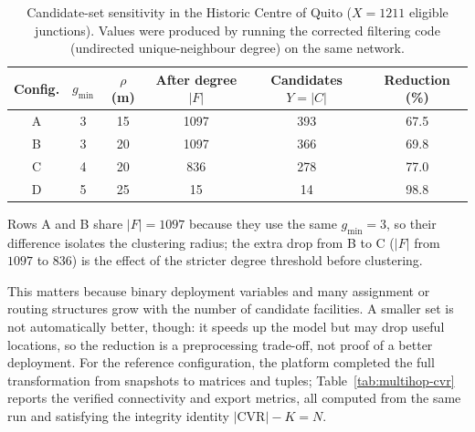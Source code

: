 \documentclass[engproc,proceedingpaper,submit,oneauthor]{Definitions/mdpi}
\newcommand{\CVR}{\mathrm{CVR}}
\begin{document}
\begin{table}[H]
\centering
\caption{Candidate-set sensitivity in the Historic Centre of Quito
($X=1211$ eligible junctions). Values were produced by running the corrected filtering
code (undirected unique-neighbour degree) on the same network.}\label{tab:sensitivity}
\small
\begin{tabular}{cccccc}
\toprule
Config. & $g_{\min}$ & $\rho$ (m) & After degree $|F|$ &
Candidates $Y=|C|$ & Reduction (\%)\\
\midrule
A & 3 & 15 & 1097 & 393 & 67.5\\
B & 3 & 20 & 1097 & 366 & 69.8\\
C & 4 & 20 & \phantom{0}836 & 278 & 77.0\\
D & 5 & 25 & \phantom{00}15 & \phantom{0}14 & 98.8\\
\bottomrule
\end{tabular}
\end{table}

Rows A and B share $|F|=1097$ because they use the same $g_{\min}=3$, so their
difference isolates the clustering radius; the extra drop from B to C ($|F|$ from
$1097$ to $836$) is the effect of the stricter degree threshold before clustering.

This matters because binary deployment variables and many assignment or routing
structures grow with the number of candidate facilities. A smaller set is not
automatically better, though: it speeds up the model but may drop useful locations, so
the reduction is a preprocessing trade-off, not proof of a better deployment. For the
reference configuration, the platform completed the full transformation from snapshots
to matrices and tuples; Table~\ref{tab:multihop-cvr} reports the verified connectivity
and export metrics, all computed from the same run and satisfying the integrity
identity $|\CVR|-K=N$.
\end{document}
